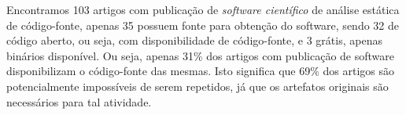 Encontramos 103 artigos com publicação de {\it software científico} de análise
estática de código-fonte, apenas 35 possuem fonte para obtenção do software,
sendo 32 de código aberto, ou seja, com disponibilidade de código-fonte, e 3
grátis, apenas binários disponível. Ou seja, apenas 31\% dos artigos com
publicação de software disponibilizam o código-fonte das mesmas. Isto significa
que 69\% dos artigos são potencialmente impossíveis de serem repetidos, já que
os artefatos originais são necessários para tal atividade.



%
%
%
